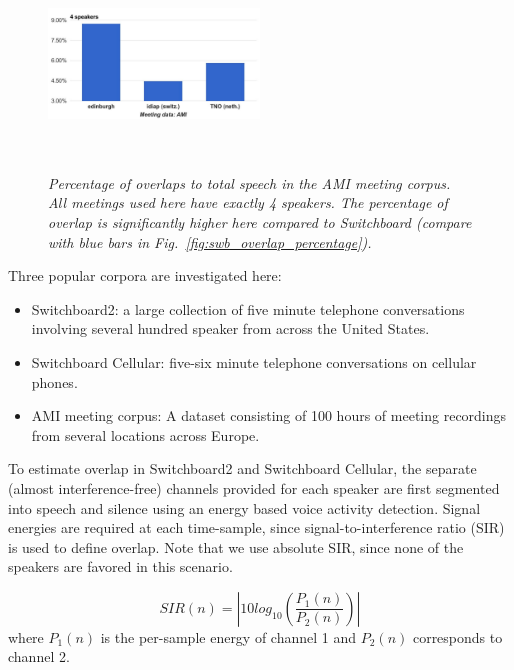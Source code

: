 \begin{figure}[h!]
	\vspace{0mm}
	\centering
	\includegraphics[height = 2.2in, width=0.5\textwidth]{chapters/cochannelplda_jp/IEEEtran/figures/ami_overlap_percentage-crop}
	\vspace{-3mm}
	\caption{\it \small Percentage of overlaps to total speech in the AMI meeting corpus. All meetings used here have exactly 4 speakers. 
		The percentage of overlap is significantly higher here compared to Switchboard (compare with blue bars in Fig.~\ref{fig:swb_overlap_percentage}).}
	\label{fig:ami_overlap_percentage}
	\vspace{-3mm}
\end{figure}


Three popular corpora are investigated here: 
\begin{itemize}
	\item Switchboard2: a large collection of five minute telephone conversations involving several hundred speaker from across the United States.
	\item Switchboard Cellular: five-six minute telephone conversations on cellular phones.
	\item AMI meeting corpus: A dataset consisting of 100 hours of meeting recordings from several locations across Europe. 
\end{itemize}

\pagebreak

To estimate overlap in Switchboard2 and Switchboard Cellular, the separate (almost interference-free) channels provided for each speaker are first segmented into speech and silence using an energy based voice activity detection. 
Signal energies are required at each time-sample, since signal-to-interference ratio (SIR) is used to define overlap. 
Note that we use absolute SIR, since none of the speakers are favored in this scenario. 

\begin{equation}
\label{eq:abs_sir}
SIR(n) = |10log_{10}(\frac{P_1(n)}{P_2(n)})|
\end{equation}
where $P_1(n)$ is the per-sample energy of channel 1 and $P_2(n)$ corresponds to channel 2. 

